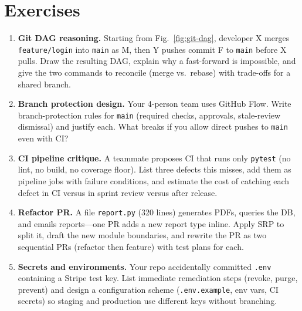 \section{Exercises}
\label{sec:ch05-exercises}
\begin{enumerate}[label=E5.\arabic*, leftmargin=*, itemsep=0.6em]
    \item \textbf{Git DAG reasoning.} Starting from Fig.~\ref{fig:git-dag}, developer X merges \texttt{feature/login} into \texttt{main} as M, then Y pushes commit F to \texttt{main} before X pulls. Draw the resulting DAG, explain why a fast-forward is impossible, and give the two commands to reconcile (merge vs.\ rebase) with trade-offs for a shared branch.
    \item \textbf{Branch protection design.} Your 4-person team uses GitHub Flow. Write branch-protection rules for \texttt{main} (required checks, approvals, stale-review dismissal) and justify each. What breaks if you allow direct pushes to \texttt{main} even with CI?
    \item \textbf{CI pipeline critique.} A teammate proposes CI that runs only \texttt{pytest} (no lint, no build, no coverage floor). List three defects this misses, add them as pipeline jobs with failure conditions, and estimate the cost of catching each defect in CI versus in sprint review versus after release.
    \item \textbf{Refactor PR.} A file \texttt{report.py} (320 lines) generates PDFs, queries the DB, and emails reports---one PR adds a new report type inline. Apply SRP to split it, draft the new module boundaries, and rewrite the PR as two sequential PRs (refactor then feature) with test plans for each.
    \item \textbf{Secrets and environments.} Your repo accidentally committed \texttt{.env} containing a Stripe test key. List immediate remediation steps (revoke, purge, prevent) and design a configuration scheme (\texttt{.env.example}, env vars, CI secrets) so staging and production use different keys without branching.
\end{enumerate}
